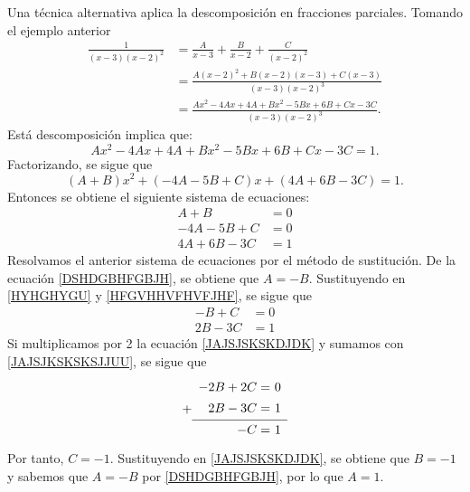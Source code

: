 \begin{BOX}
    Una técnica alternativa aplica la descomposición en fracciones parciales. Tomando el ejemplo anterior
    \begin{align*}
        \frac{1}{(x-3)(x-2)^2} & = \frac{A}{x-3} + \frac{B}{x-2} + \frac{C}{(x-2)^{2}} \\
        & = \frac{A(x-2)^{2} + B(x-2)(x-3) + C(x-3)}{(x-3)(x-2)^{3}} \\
        & = \frac{Ax^{2} - 4Ax + 4A + Bx^{2} - 5Bx + 6B + Cx -3C}{(x-3)(x-2)^{3}}.
    \end{align*}
    Está descomposición implica que:
    $$Ax^{2} - 4Ax + 4A + Bx^{2} - 5Bx + 6B + Cx -3C = 1.$$
    Factorizando, se sigue que
    $$(A + B)x^{2} + (-4A -5B + C)x + (4A + 6B -3C) = 1.$$
    Entonces se obtiene el siguiente sistema de ecuaciones:
    \begin{align}
        A + B & = 0 \label{DSHDGBHFGBJH}\\
        -4A - 5B + C & = 0 \label{HYHGHYGU} \\
        4A + 6B -3C & = 1 \label{HFGVHHVFHVFJHF}
    \end{align}
    Resolvamos el anterior sistema de ecuaciones por el método de sustitución. De la ecuación \eqref{DSHDGBHFGBJH}, se obtiene que $A = -B$. Sustituyendo en \eqref{HYHGHYGU} y \eqref{HFGVHHVFHVFJHF}, se sigue que
    \begin{align}
        -B + C & = 0 \label{JAJSJSKSKDJDK} \\
        2B - 3C & = 1 \label{JAJSJKSKSKSJJUU}
    \end{align}
    Si multiplicamos por 2 la ecuación \eqref{JAJSJSKSKDJDK} y sumamos con \eqref{JAJSJKSKSKSJJUU}, se sigue que
    $${
    \extrarowheight = -0.5ex
    \renewcommand{\arraystretch}{1.7}
    + \begin{array}{rl}
        -2B+2C = & \!\!\!\! 0 \\
        2B-3C = & \!\!\!\! 1 \\
        \hline
        -C = & \!\!\!\! 1
    \end{array}}$$
    Por tanto, $C = -1$. Sustituyendo en \eqref{JAJSJSKSKDJDK}, se obtiene que $B = -1$ y sabemos que $A = -B$ por \eqref{DSHDGBHFGBJH}, por lo que $A = 1$.
    

\end{BOX}
